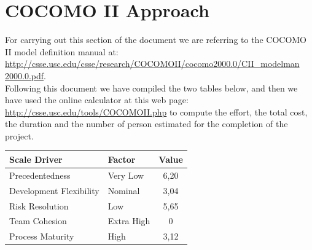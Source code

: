\chapter{COCOMO II Approach} \label{chap3}
For carrying out this section of the document we are referring to the COCOMO II model definition manual at:\\
\href{http://csse.usc.edu/csse/research/COCOMOII/cocomo2000.0/CII\_modelman2000.0.pdf}{http://csse.usc.edu/csse/research/COCOMOII/cocomo2000.0/CII\_modelman\\2000.0.pdf}.\\
Following this document we have compiled the two tables below, and then we have used the online calculator at this web page: \href{http://csse.usc.edu/tools/COCOMOII.php}{http://csse.usc.edu/tools/COCOMOII.php} to compute the effort, the total cost, the duration and the number of person estimated for the completion of the project.

\begin{table}[!htbp]
\begin{center}
\begin{tabular}[t]{|p{}|p{}|c|}
\hline
\textbf{Scale Driver} & \textbf{Factor} & \textbf{Value} \\
\hline
\hline
Precedentedness & Very Low & 6,20 \\
\hline
Development Flexibility & Nominal & 3,04 \\
\hline
Risk Resolution & Low & 5,65 \\
\hline
Team Cohesion & Extra High & 0 \\
\hline
Process Maturity & High & 3,12 \\
\hline
\end{tabular}
\end{center}
\end{table}
\clearpage

